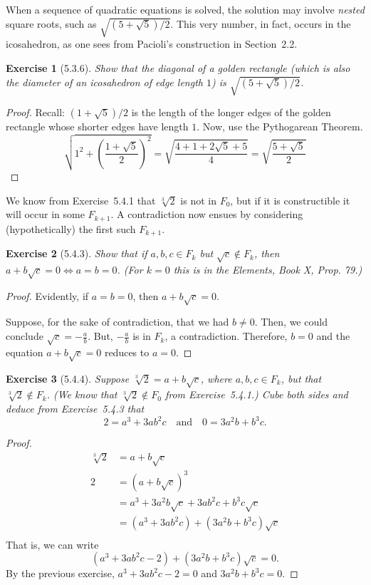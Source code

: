 \documentclass[12pt]{article}
\theoremstyle{plain}
\newtheorem{ex}{Exercise}
\begin{document}
When a sequence of quadratic equations is solved, the solution may involve \emph{nested} square roots, such as $\sqrt{(5+\sqrt{5})/2}$. This very number, in fact, occurs in the icosahedron, as one sees from Pacioli's construction in Section~2.2.

\begin{ex} [5.3.6]
  Show that the diagonal of a golden rectangle (which is also the diameter of an icosahedron of edge length $1$) is $\sqrt{(5+\sqrt{5})/2}$.
\end{ex}

\begin{proof}
  Recall: $(1+\sqrt{5})/2$ is the length of the longer edges of the golden rectangle whose shorter edges have length $1$. Now, use the Pythogarean Theorem.
  \[
    \sqrt{1^2+\left(\frac{1+\sqrt{5}}{2}\right)^2}=\sqrt{\frac{4+1+2\sqrt{5}+5}{4}}=\sqrt{\frac{5+\sqrt{5}}{2}}
  \]
\end{proof}

We know from Exercise~5.4.1 that $\sqrt[3]{2}$ is not in $F_0$, but if it is constructible it will occur in some $F_{k+1}$. A contradiction now ensues by considering (hypothetically) the first such $F_{k+1}$.

\begin{ex} [5.4.3]
  Show that if $a,b,c\in F_k$ but $\sqrt{c}\notin F_k$, then $a+b\sqrt{c}=0\Leftrightarrow a=b=0$. (For $k=0$ this is in the \emph{Elements}, Book X, Prop. 79.)
\end{ex}

\begin{proof}
  Evidently, if $a=b=0$, then $a+b\sqrt{c}=0$.

  Suppose, for the sake of contradiction, that we had $b\neq0$. Then, we could conclude $\sqrt{c}=-\frac{a}{b}$. But, $-\frac{a}{b}$ is in $F_k$, a contradiction. Therefore, $b=0$ and the equation $a+b\sqrt{c}=0$ reduces to $a=0$.
\end{proof}

\begin{ex} [5.4.4]
  Suppose $\sqrt[3]{2}=a+b\sqrt{c}$, where $a,b,c\in F_k$, but that $\sqrt[3]{2}\notin F_k$. (We know that $\sqrt[3]{2}\notin F_0$ from Exercise~5.4.1.) Cube both sides and deduce from Exercise~5.4.3 that
  \[
    2=a^3+3ab^2c\quad\text{and}\quad0=3a^2b+b^3c.
  \]
\end{ex}

\begin{proof}
  \begin{align*}
    \sqrt[3]{2} &= a+b\sqrt{c} \\
    2           &= (a+b\sqrt{c})^3 \\
                &= a^3+3a^2b\sqrt{c}+3ab^2c+b^3c\sqrt{c} \\
                &= (a^3+3ab^2c)+(3a^2b+b^3c)\sqrt{c} \\
  \end{align*}
  That is, we can write
  \[
    (a^3+3ab^2c-2)+(3a^2b+b^3c)\sqrt{c}=0.
  \]
  By the previous exercise, $a^3+3ab^2c-2=0$ and $3a^2b+b^3c=0$.
\end{proof}
\end{document}

